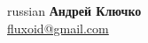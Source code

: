 \documentclass[12pt]{article}
\begin{document}
\setlength{\topskip}{0mm}
\setlength{\parindent}{0pt}
\setlength{\parskip}{5pt}
\raggedright
\raggedbottom
\large
{}

\begin{otherlanguage*}{russian}
\textbf{Андрей Ключко}\\%
\href{mailto:fluxoid@gmail.com}{fluxoid@gmail.com}
\end{otherlanguage*}

\vspace{1em}
\end{document}
